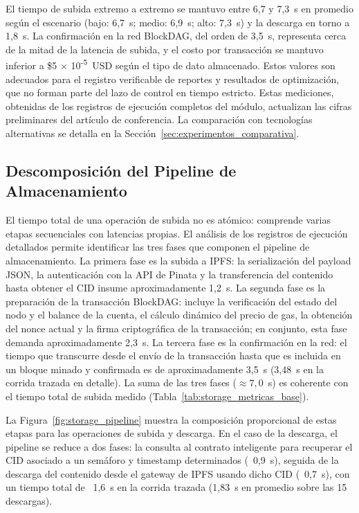 El tiempo de subida extremo a extremo se mantuvo entre 6,7 y 7,3~s en promedio según el
escenario (bajo: 6,7~s; medio: 6,9~s; alto: 7,3~s) y la descarga en torno a 1,8~s.
La confirmación en la red BlockDAG, del orden de 3,5~s, representa cerca de la mitad
de la latencia de subida, y el costo por transacción se mantuvo inferior a
\$5 $\times$ 10\textsuperscript{-5}~USD según el tipo de dato almacenado. Estos
valores son adecuados para el registro verificable de reportes y resultados de
optimización, que no forman parte del lazo de control en tiempo estricto.
Estas mediciones, obtenidas de los registros de ejecución completos del módulo,
actualizan las cifras preliminares del artículo de conferencia. La comparación con
tecnologías alternativas se detalla en la
Sección~\ref{sec:experimentos_comparativa}.

\subsection{Descomposición del Pipeline de Almacenamiento}
\label{subsec:storage_pipeline}

El tiempo total de una operación de subida no es atómico: comprende varias etapas
secuenciales con latencias propias. El análisis de los registros de ejecución detallados
permite identificar las tres fases que componen el pipeline de almacenamiento. La primera
fase es la subida a IPFS: la serialización del payload JSON, la autenticación
con la API de Pinata y la transferencia del contenido hasta obtener el CID insume
aproximadamente 1,2~s. La segunda fase es la preparación de la transacción
BlockDAG: incluye la verificación del estado del nodo y el balance de la cuenta,
el cálculo dinámico del precio de gas, la obtención del nonce actual y la firma
criptográfica de la transacción; en conjunto, esta fase demanda aproximadamente 2,3~s.
La tercera fase es la confirmación en la red: el tiempo que transcurre desde
el envío de la transacción hasta que es incluida en un bloque minado y confirmada
es de aproximadamente 3,5~s (3,48~s en la corrida trazada en detalle). La suma de las tres
fases ($\approx 7{,}0$~s) es coherente con el tiempo total de subida medido
(Tabla~\ref{tab:storage_metricas_base}).

La Figura~\ref{fig:storage_pipeline} muestra la composición proporcional de estas
etapas para las operaciones de subida y descarga. En el caso de la descarga, el
pipeline se reduce a dos fases: la consulta al contrato inteligente para recuperar
el CID asociado a un semáforo y timestamp determinados (~0,9~s), seguida de la
descarga del contenido desde el gateway de IPFS usando dicho CID (~0,7~s), con
un tiempo total de ~1,6~s en la corrida trazada (1,83~s en promedio sobre las 15 descargas).

